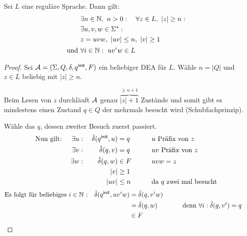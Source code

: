 \begin{lemma}\label{lem:pumping}
        Sei $L$ eine reguläre Sprache. Dann gilt:
        \begin{alignat*}{2}
                &\exists n\in\N,\ n>0:\quad \forall z\in L,\ |z|\geq n:\\
                &\exists u,v,w\in\Sigma^* :\\
                &z = uvw,\ |uv| \leq n,\ |v| \geq 1\\
                \text{und }& \forall i\in\N:\ uv^iw\in L
        \end{alignat*}
\end{lemma}
\vspace{-2em}
\begin{proof}
	Sei $\mathcal{A}=(\Sigma, Q,\delta,{q^\mathsf{init}},F)$ ein beliebiger \ac{DEA} für $L$.
	Wähle $n=|Q|$ und $z\in L$ beliebig mit $|z|\geq n$.
	
	\vspace{-1em}
	
	Beim Lesen von $z$ durchläuft $\mathcal{A}$ genau $\overbrace{|z|+1}^{\geq n+1}$ Zustände und somit gibt es mindestens einen Zustand $q\in Q$ der mehrmals besucht wird (Schubfachprinzip).
	
	Wähle das $q$, dessen zweiter Besuch zuerst passiert.
	\begin{alignat*}{3}
		\text{Nun gilt: }\quad
		\exists u:\; && \tilde\delta({q^\mathsf{init}},u)&=q &\qquad& u\text{ Präfix von }z\\
		\exists v:\; && \tilde\delta(q,v)&=q && uv\text{ Präfix von }z\\
		\exists w:\; && \tilde\delta(q,w)&\in F && uvw=z\\
		&& |v| &\geq 1\\
		&& |uv| &\leq n && \text{da $q$ zwei mal besucht}
	\end{alignat*}
	\begin{alignat*}{2}
		\text{Es folgt für beliebiges $i\in\mathbb{N}$ :}\quad \tilde\delta({q^\mathsf{init}},uv^iw) &= \tilde\delta(q,v^iw)\\
		&= \tilde\delta(q,w) &\qquad& \text{denn }\forall i: \tilde\delta(q,v^i)=q\\
		&\in F \tag*{\qedhere}
	\end{alignat*}
\end{proof}

